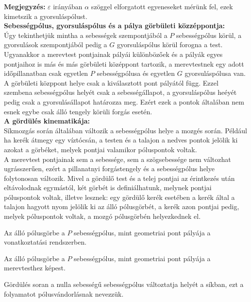 \textbf{Megjegyzés:} \(\varepsilon\) irányában \(\alpha\) szöggel elforgatott egyeneseket mérünk fel, ezek kimetszik a gyorsuláspólust.\\
 \textbf{Sebességpólus, gyorsuláspólus és a pálya görbületi közzéppontja:}\\
 Úgy tekinthetjük mintha a sebességek szempontjából a \(P\) sebességpólus körül, a gyorsulások szempontjából pedig a \(G\) gyorsuláspólus körül forogna a test.  Ugyanakkor a merevtest pontjainak pályái különbözőek és a pályák egyes pontjaihoz is más és más görbületi középpont tartozik, a merevtestnek egy adott időpillanatban csak  egyetlen \(P\) sebességpólusa és egyetlen \(G\) gyorsuláspólusa van. 
 A görbületi közppont helye csak a kiválasztott pont pályától függ. Ezzel szembena sebességpólus helyét csak a sebességállapot, a gyorsuláspólus heéyét pedig csak a gyorsulásállapot határozza meg. Ezért ezek a pontok általában nem esnek egybe csak álló tengely körüli forgás esetén.\\
\newpage
 \textbf{A gördülés kinematikája:}\\
Síkmozgás során általában változik a sebességpólus helye a mozgés során. Például ha kerék átmegy egy víztócsán, a testen és a talajon a nedves pontok jelölik ki azokat a görbéket, melyek pontjai valamikor póluspontok voltak. \\
A merevtest pontjainak sem a sebessége, sem a szögsebessége nem változhat ugrásszerűen, ezért a pillanatnyi forgástengely és a sebességpólus helye folytonosan változik. Mivel a gördülő test és a telej pontjai az érintkezés után eltávolodnak egymástól, két görbét is definiálhatunk, melynek pontjai póluspontok voltak, illetve lesznek: egy gördülő kerék esetében a kerék által a talajon hagyott nyom jelölik ki az álló pólusgörbét, a kerék azon pontjai pedig, melyek póluspontok voltak, a mozgó pólusgörbén helyezkednek el.
\begin{tcolorbox}[colback=MidnightBlue!5!white,colframe=MidnightBlue!60!black,title= Definíció]
    Az álló pólusgörbe a \(P\) sebességpólus, mint geometriai pont pályája a vonatkoztatási rendszerben.
 \end{tcolorbox}
\begin{tcolorbox}[colback=MidnightBlue!5!white,colframe=MidnightBlue!60!black,title= Definíció]
    Az álló pólusgörbe a \(P\) sebességpólus, mint geometriai pont pályája a merevtesthez képest.
 \end{tcolorbox}
 Gördülés soran a nulla sebességű sebességpólus változtatja helyét a síkban, ezt a folyamatot pólusvándorlásnak nevezzük.
